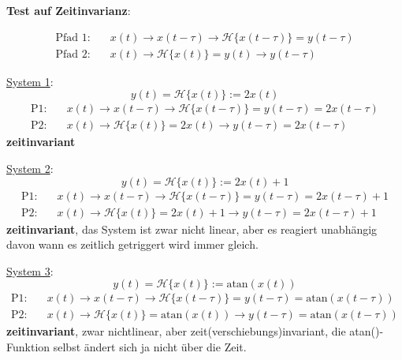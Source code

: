 \documentclass[11pt,a4paper,DIV=12]{scrartcl}
\numberwithin{equation}{section}
\numberwithin{figure}{section}
\newcommand{\sysH}[1]{\mathcal{H}{\{#1\}}}
\begin{document}
\begin{Loesung}
\textbf{Test auf Zeitinvarianz}:

\begin{align}
\text{Pfad 1:} \quad &x(t)\rightarrow x(t-\tau)\rightarrow \mathcal{H}\{x(t-\tau)\}=y(t-\tau)\\
\text{Pfad 2:} \quad &x(t)\rightarrow \mathcal{H}\{x(t)\}=y(t)\rightarrow y(t-\tau)
\end{align}

\item  \underline{System 1}:
\begin{equation}
y(t) = \sysH{x(t)}:=2 x(t)
\end{equation}
\begin{align}
\text{P1:}& \quad x(t)\rightarrow x(t-\tau)\rightarrow \mathcal{H}\{x(t-\tau)\}=y(t-\tau)=2 x(t-\tau)\\
\text{P2:}& \quad x(t)\rightarrow \mathcal{H}\{x(t)\}=2 x(t)\rightarrow y(t-\tau)=2 x(t-\tau)
\end{align}
\textbf{zeitinvariant}


\item  \underline{System 2}:
\begin{equation}
y(t) = \sysH{x(t)}:= 2 x(t) + 1
\end{equation}
\begin{align}
\text{P1:}& \quad x(t)\rightarrow x(t-\tau)\rightarrow \mathcal{H}\{x(t-\tau)\}=y(t-\tau)=2 x(t-\tau) + 1\\
\text{P2:}& \quad x(t)\rightarrow \mathcal{H}\{x(t)\}=2 x(t)+1\rightarrow y(t-\tau)=2 x(t-\tau) +1
\end{align}
\textbf{zeitinvariant}, das System ist zwar nicht linear, aber es reagiert
unabhängig davon wann es zeitlich getriggert wird immer gleich.


\item  \underline{System 3}:
\begin{equation}
y(t) = \sysH{x(t)}:= \mathrm{atan}(x(t))
\end{equation}
\begin{align}
\text{P1:}& \quad x(t)\rightarrow x(t-\tau)\rightarrow \mathcal{H}\{x(t-\tau)\}=y(t-\tau)=\mathrm{atan}(x(t-\tau))\\
\text{P2:}& \quad x(t)\rightarrow \mathcal{H}\{x(t)\}=\mathrm{atan}(x(t))\rightarrow y(t-\tau)=\mathrm{atan}(x(t-\tau))
\end{align}
\textbf{zeitinvariant}, zwar nichtlinear, aber zeit(verschiebungs)invariant, die
atan()-Funktion selbst ändert sich ja nicht über die Zeit.


\end{Loesung}
\end{document}
